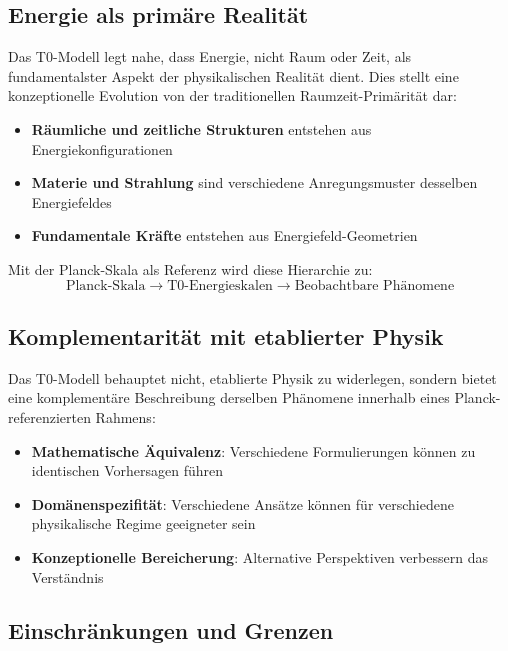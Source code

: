 \documentclass[12pt,a4paper]{report}
\begin{document}
	\subsection{Energie als primäre Realität}\label{subsec:energy_primary_reality}
	
	Das T0-Modell legt nahe, dass Energie, nicht Raum oder Zeit, als fundamentalster Aspekt der physikalischen Realität dient. Dies stellt eine konzeptionelle Evolution von der traditionellen Raumzeit-Primärität dar:
	
	\begin{itemize}
		\item \textbf{Räumliche und zeitliche Strukturen} entstehen aus Energiekonfigurationen
		\item \textbf{Materie und Strahlung} sind verschiedene Anregungsmuster desselben Energiefeldes
		\item \textbf{Fundamentale Kräfte} entstehen aus Energiefeld-Geometrien
	\end{itemize}
	
	Mit der Planck-Skala als Referenz wird diese Hierarchie zu:
	\begin{equation}
		\text{Planck-Skala} \to \text{T0-Energieskalen} \to \text{Beobachtbare Phänomene}
	\end{equation}
	
	\subsection{Komplementarität mit etablierter Physik}\label{subsec:complementarity}
	
	Das T0-Modell behauptet nicht, etablierte Physik zu widerlegen, sondern bietet eine komplementäre Beschreibung derselben Phänomene innerhalb eines Planck-referenzierten Rahmens:
	
	\begin{itemize}
		\item \textbf{Mathematische Äquivalenz}: Verschiedene Formulierungen können zu identischen Vorhersagen führen
		\item \textbf{Domänenspezifität}: Verschiedene Ansätze können für verschiedene physikalische Regime geeigneter sein
		\item \textbf{Konzeptionelle Bereicherung}: Alternative Perspektiven verbessern das Verständnis
	\end{itemize}
	
	\subsection{Einschränkungen und Grenzen}\label{subsec:limitations_boundaries}
	
\end{document}
